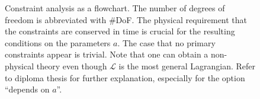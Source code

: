 \documentclass{article}
\newcommand{\Lag}{\mathcal{L}}
\begin{document}
\begin{figure}
  \centering
  
  \caption[Constraint analysis as a flowchart]{Constraint analysis as
    a flowchart. The number of degrees of freedom is abbreviated with
    \#DoF. The physical requirement that the constraints are conserved
    in time is crucial for the resulting conditions on the parameters
    $a$. The case that no primary constraints appear is trivial. Note
    that one can obtain a non-physical theory even though $\Lag$ is
    the most general Lagrangian.  Refer to
    diploma thesis for further explanation, especially
    for the option \enquote{depends on $a$}.}
\end{figure}
\end{document}
